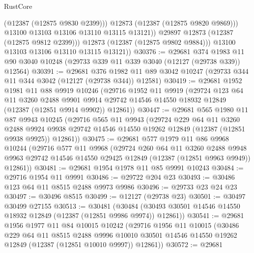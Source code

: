 \begin{lexlean}{RustCore}
\begin{coremodule}
                    (@12387 (@12875 @9830 @2399)))
                  @12873
                  (@12387 (@12875 @9820 @9869)))
                @13100
                @13103
                @13106
                @13110
                @13115
                @13121))
            @29897
            @12873
            (@12387 (@12875 @9812 @2399)))
          @12873
          (@12387 (@12875 @9802 @9884)))
        @13100
        @13103
        @13106
        @13110
        @13115
        @13121))
@30376 := @29681
    @374
    @1983
    @11
    @90
    @3040
    @10248
    (@29733 @339 @11 @339 @3040 (@12127 (@29738 @339)) @12564)
@30391 := @29681
    @376
    @1982
    @11
    @89
    @3042
    @10247
    (@29733 @344 @11 @344 @3042 (@12127 (@29738 @344)) @12581)
@30419 := @29681
    @1952
    @1981
    @11
    @88
    @9919
    @10246
    (@29716
      @1952
      @11
      @9919
      (@29724
        @123
        @64
        @11
        @3260
        @2488
        @9901
        @9914
        @29742
        @14546
        @14550
        @18932
        @12849
        (@12387 (@12851 @9914 @9902))
        @12861))
@30447 := @29681
    @565
    @1980
    @11
    @87
    @9943
    @10245
    (@29716
      @565
      @11
      @9943
      (@29724
        @229
        @64
        @11
        @3260
        @2488
        @9924
        @9938
        @29742
        @14546
        @14550
        @19262
        @12849
        (@12387 (@12851 @9938 @9925))
        @12861))
@30475 := @29681
    @577
    @1979
    @11
    @86
    @9968
    @10244
    (@29716
      @577
      @11
      @9968
      (@29724
        @260
        @64
        @11
        @3260
        @2488
        @9948
        @9963
        @29742
        @14546
        @14550
        @29425
        @12849
        (@12387 (@12851 @9963 @9949))
        @12861))
@30481 := @29681 @1954 @1978 @11 @85 @9991 @10243
@30484 := @29716 @1954 @11 @9991
@30486 := @29722 @204 @23
@30493 := @30486 @123 @64 @11 @8515 @2488 @9973 @9986
@30496 := @29733 @23 @24 @23
@30497 := @30496 @8515
@30499 := @12127 (@29738 @23)
@30501 := @30497 @30499 @27155
@30513 := @30481
    (@30484 (@30493 @30501 @14546 @14550 @18932 @12849 (@12387 (@12851 @9986 @9974)) @12861))
@30541 := @29681
    @1956
    @1977
    @11
    @84
    @10015
    @10242
    (@29716
      @1956
      @11
      @10015
      (@30486
        @229
        @64
        @11
        @8515
        @2488
        @9996
        @10010
        @30501
        @14546
        @14550
        @19262
        @12849
        (@12387 (@12851 @10010 @9997))
        @12861))
@30572 := @29681

\end{coremodule}
\end{lexlean}
